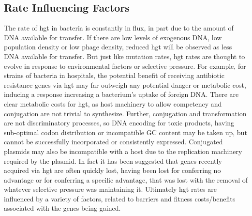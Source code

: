 \subsection{Rate Influencing Factors}
The rate of \ac{hgt} in bacteria is constantly in flux, in part due to the amount of DNA available for transfer\citep{trendbs}.
If there are low levels of exogenous DNA, low population density or low phage density, reduced \ac{hgt} will be observed as less DNA available for transfer\citep{lgt}.
But just like mutation rates, \ac{hgt} rates are thought to evolve in response to environmental factors or selective pressure\citep{mtrate,hgtrate}.
For example, for strains of bacteria in hospitals, the potential benefit of receiving antibiotic resistance genes via \ac{hgt} may far outweigh any potential danger or metabolic cost, inducing a response increasing a bacterium's uptake of foreign DNA.\citep{hospital}
There are clear metabolic costs for \ac{hgt}, as host machinery to allow competency and conjugation are not trivial to synthesize\citep{hgtcost}.
Further, conjugation and transformation are not discriminatory processes, so DNA encoding for toxic products, having sub-optimal codon distribution or incompatible GC content may be taken up, but cannot be successfully incorporated or consistently expressed\citep{hgtcost}.
Conjugated plasmids may also be incompatible with a host due to the replication machinery required by the plasmid\citep{plasincom}.
In fact it has been suggested that genes recently acquired via \ac{hgt} are often quickly lost, having been lost for conferring no advantage or for conferring a specific advantage, that was lost with the removal of whatever selective pressure was maintaining it\citep{fastlane}.
Ultimately \ac{hgt} rates are influenced by a variety of factors, related to barriers and fitness costs/benefits associated with the genes being gained.
